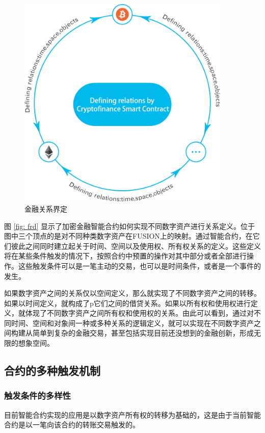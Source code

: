 \documentclass[a4paper,12pt]{article}
\begin{document}
\begin{figure}[htbp]
\centering\includegraphics[width=4in]{pic/financialization.png}
\caption{金融关系界定}\label{fig:1}
\end{figure}

图 \ref{fig: frd} 显示了加密金融智能合约如何实现不同数字资产进行关系定义。位于图中三个顶点的是对不同种类数字资产在FUSION上的映射。通过智能合约，在它们彼此之间同时建立起关于时间、空间以及使用权、所有权关系的定义。这些定义将在某些条件触发的情况下，按照合约中预置的操作对其中部分或者全部进行操作。这些触发条件可以是一笔主动的交易，也可以是时间条件，或者是一个事件的发生。

如果数字资产之间的关系仅以空间定义，那么就实现了不同数字资产之间的转移。如果以时间定义，就构成了p它们之间的借贷关系。如果以所有权和使用权进行定义，就体现了不同数字资产之间所有权和使用权的关系。由此可以看到，通过对不同时间、空间和对象间一种或多种关系的逻辑定义，就可以实现在不同数字资产之间构建从简单到复杂的金融交易，甚至包括实现目前还没想到的金融创新，形成无限的想象空间。

\subsection{合约的多种触发机制}

\subsubsection{触发条件的多样性}

目前智能合约实现的应用是以数字资产所有权的转移为基础的，这是由于当前智能合约是以一笔向该合约的转账交易触发的。
\end{document}
